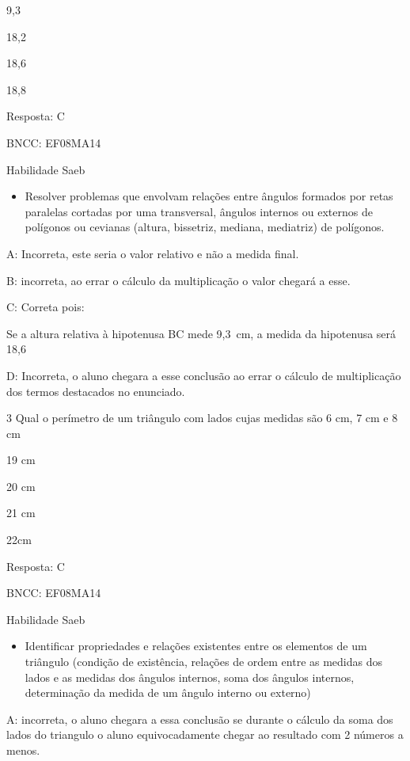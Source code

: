 \item 9,3
\item 18,2
\item 18,6
\item 18,8

Resposta: C

BNCC: EF08MA14

Habilidade Saeb

\begin{itemize}
\tightlist

\item 
  Resolver problemas que envolvam relações entre ângulos formados por
  retas paralelas cortadas por uma transversal, ângulos internos ou
  externos de polígonos ou cevianas (altura, bissetriz, mediana,
  mediatriz) de polígonos.
\end{itemize}

A: Incorreta, este seria o valor relativo e não a medida final.

B: incorreta, ao errar o cálculo da multiplicação o valor chegará a
esse.

C: Correta pois:

Se a altura relativa à hipotenusa BC mede 9,3~cm, a medida da hipotenusa
será 18,6

D: Incorreta, o aluno chegara a esse conclusão ao errar o cálculo de
multiplicação dos termos destacados no enunciado.

\num{3} Qual o perímetro de um triângulo com lados cujas medidas são 6 cm, 7
cm e 8 cm

\item 19 cm
\item 20 cm
\item 21 cm
\item 22cm

Resposta: C

BNCC: EF08MA14

Habilidade Saeb

\begin{itemize}
\tightlist

\item 
  Identificar propriedades e relações existentes entre os elementos de
  um triângulo (condição de existência, relações de ordem entre as
  medidas dos lados e as medidas dos ângulos internos, soma dos ângulos
  internos, determinação da medida de um ângulo interno ou externo)
\end{itemize}

A: incorreta, o aluno chegara a essa conclusão se durante o cálculo da
soma dos lados do triangulo o aluno equivocadamente chegar ao resultado
com 2 números a menos.

